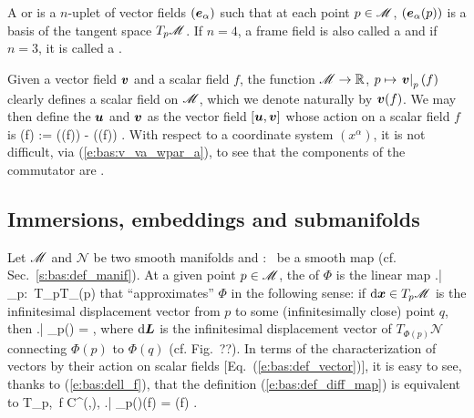A  or
 is a $n$-uplet of vector fields
$(\bm{e}_\alpha)$ such that at each point $p\in\mathscr{M}$, $(\bm{e}_\alpha(p))$ is
a basis of the tangent space $T_p\mathscr{M}$.
If $n=4$, a frame field is also called a  and if $n=3$,
it is called a
.

Given a vector field $\bm{v}$ and a scalar field $f$, the function
$\mathscr{M}\rightarrow \mathbb{R}$, $p\mapsto \left.\bm{v}\right|_p(f)$ clearly defines a scalar field on
$\mathscr{M}$, which we denote naturally by $\bm{v}(f)$.
We may then define the  $\bm{u}$
and $\bm{v}$ as the vector field $[\bm{u},\bm{v}]$ whose action on a scalar field $f$ is
\be
  [\w{u},\w{v}](f) := ((f)) - ((f)) .
\ee
With respect to a coordinate system $(x^\alpha)$, it is not difficult, via
(\ref{e:bas:v_va_wpar_a}), to see that the components of the commutator are
\be \label{e:bas:commut_comp}
   .
\ee

\subsection{Immersions, embeddings and submanifolds} \label{s:bas:embed}

Let $\mathscr{M}$ and $\mathscr{N}$ be two smooth manifolds
and
\be
    \Phi:\ \M \longrightarrow {}
\ee
be a smooth map (cf. Sec.~\ref{s:bas:def_manif}).
At a given point $p\in\mathscr{M}$, the 
of $\Phi$ is the linear map
\be
    \left.\D\Phi \right| _p:\ T_p\M \longrightarrow T_{\Phi(p)}
\ee
that ``approximates'' $\Phi$ in the following sense: if $\mathrm{d}\bm{x}\in T_p\mathscr{M}$ is the
infinitesimal displacement vector from $p$ to some (infinitesimally close) point $q$,
then
\be \label{e:bas:def_diff_map}
    \left.\D\Phi \right| _p(\D{}) = \D{},
\ee
where $\mathrm{d}\bm{L}$ is the infinitesimal displacement vector of $T_{\Phi(p)}\mathscr{N}$
connecting $\Phi(p)$ to $\Phi(q)$ (cf. Fig.~??).
In terms of the characterization of vectors by their action on scalar fields
[Eq.~(\ref{e:bas:def_vector})], it is easy to see, thanks to (\ref{e:bas:dell_f}),
that the definition (\ref{e:bas:def_diff_map}) is equivalent to
\be
    \forall {}\in T_p\M,\ \forall f \in C^\infty(,),\quad
    \left.\D\Phi \right| _p()(f) =
        \left(f\circ \Phi \right) .
\ee


